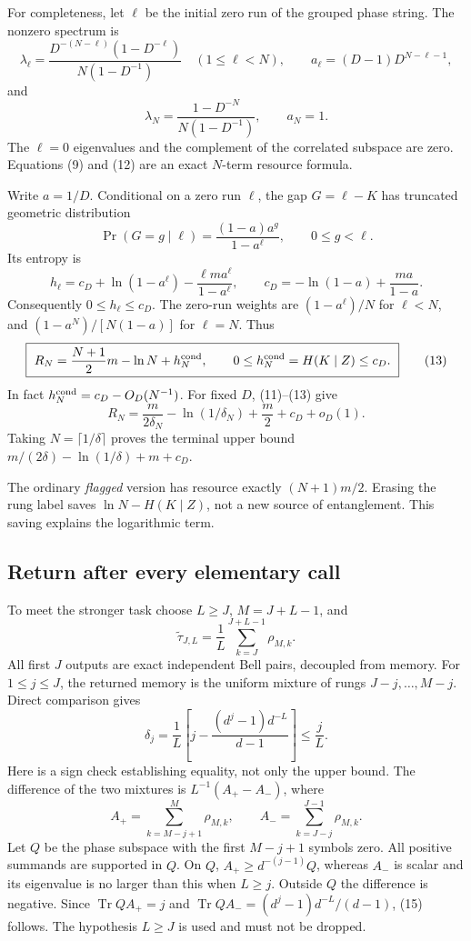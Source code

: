 \documentclass[11pt,a4paper]{article}
\newcommand{\tr}{\operatorname{Tr}}
\begin{document}
For completeness, let \(\ell\) be the initial zero run of the grouped phase
string. The nonzero spectrum is
\[
 \lambda_\ell=
 \frac{D^{-(N-\ell)}(1-D^{-\ell})}{N(1-D^{-1})}
 \quad(1\le\ell<N),\qquad
 a_\ell=(D-1)D^{N-\ell-1},
\]
and
\[
 \lambda_N=\frac{1-D^{-N}}{N(1-D^{-1})},\qquad a_N=1.
                                                               \tag{12}
\]
The \(\ell=0\) eigenvalues and the complement of the correlated subspace are
zero. Equations (9) and (12) are an exact \(N\)-term resource formula.

Write \(a=1/D\). Conditional on a zero run \(\ell\), the gap
\(G=\ell-K\) has truncated geometric distribution
\[
 \Pr(G=g\mid\ell)=\frac{(1-a)a^g}{1-a^\ell},
       \qquad 0\le g<\ell.
\]
Its entropy is
\[
 h_\ell=c_D+\ln(1-a^\ell)
                   -\frac{\ell m a^\ell}{1-a^\ell},\qquad
 c_D=-\ln(1-a)+\frac{ma}{1-a}.
\]
Consequently \(0\le h_\ell\le c_D\).
The zero-run weights are \((1-a^\ell)/N\) for \(\ell<N\), and
\((1-a^N)/[N(1-a)]\) for \(\ell=N\).
Thus
\[
 \boxed{\ R_N=\frac{N+1}{2}m-\ln N+h_N^{\rm cond},\qquad
                  0\le h_N^{\rm cond}=H(K\mid Z)\le c_D.\ } \tag{13}
\]
In fact \(h_N^{\rm cond}=c_D-O_D(N^{-1})\).
For fixed \(D\), (11)--(13) give
\[
 R_N=\frac{m}{2\delta_N}-\ln(1/\delta_N)+\frac m2+c_D+o_D(1). \tag{14}
\]
Taking \(N=\lceil1/\delta\rceil\) proves the terminal upper bound
\(m/(2\delta)-\ln(1/\delta)+m+c_D\).

The ordinary \emph{flagged} version has resource exactly \((N+1)m/2\).
Erasing the rung label saves \(\ln N-H(K\mid Z)\), not a new source of
entanglement. This saving explains the logarithmic term.

\subsection{Return after every elementary call}
To meet the stronger task choose \(L\ge J\), \(M=J+L-1\), and
\[
 \widetilde\tau_{J,L}=\frac1L\sum_{k=J}^{J+L-1}\rho_{M,k}.
\]
All first \(J\) outputs are exact independent Bell pairs, decoupled from memory.
For \(1\le j\le J\), the returned memory is the uniform mixture of rungs
\(J-j,\ldots,M-j\). Direct comparison gives
\[
 \boxed{\quad
 \delta_j=\frac1L\left[j-
                   \frac{(d^j-1)d^{-L}}{d-1}\right]
                  \le\frac jL .
 \quad}                                                    \tag{15}
\]
Here is a sign check establishing equality, not only the upper bound.
The difference of the two mixtures is \(L^{-1}(A_+-A_-)\), where
\[
 A_+=\sum_{k=M-j+1}^{M}\rho_{M,k},\qquad
 A_-=\sum_{k=J-j}^{J-1}\rho_{M,k}.
\]
Let \(Q\) be the phase subspace with the first \(M-j+1\) symbols zero.
All positive summands are supported in \(Q\).
On \(Q\), \(A_+\ge d^{-(j-1)}Q\), whereas \(A_-\) is scalar and its
eigenvalue is no larger than this when \(L\ge j\).
Outside \(Q\) the difference is negative.
Since \(\tr QA_+=j\) and
\(\tr QA_-=(d^j-1)d^{-L}/(d-1)\), (15) follows.
The hypothesis \(L\ge J\) is used and must not be dropped.
\end{document}
